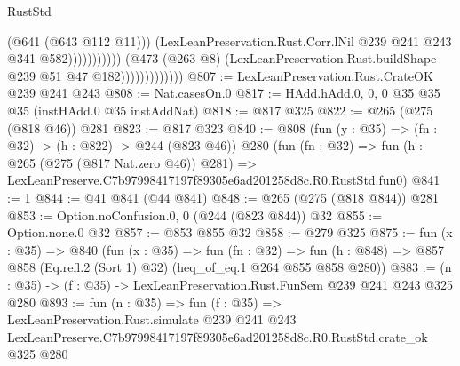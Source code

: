 \begin{lexlean}{RustStd}
\begin{coremodule}
                                                (@641 (@643 @112 @11)))
                                              (LexLeanPreservation.Rust.Corr.lNil
                                                @239
                                                @241
                                                @243
                                                @341
                                                @582)))))))))))
                          (@473
                            (@263 @8)
                            (LexLeanPreservation.Rust.buildShape @239 @51 @47 @182)))))))))))))
@807 := LexLeanPreservation.Rust.CrateOK @239 @241 @243
@808 := Nat.casesOn.{0}
@817 := HAdd.hAdd.{0, 0, 0} @35 @35 @35 (instHAdd.{0} @35 instAddNat)
@818 := @817 @325
@822 := @265 (@275 (@818 @46)) @281
@823 := @817 @323
@840 := @808
    (fun (y : @35) => (fn : @32) -> (h : @822) -> @244 (@823 @46))
    @280
    (fun (fn : @32) =>
    fun (h : @265 (@275 (@817 Nat.zero @46)) @281) =>
    LexLeanPreserve.C7b97998417197f89305e6ad201258d8c.R0.RustStd.fun0)
@841 := 1
@844 := @41 @841 (@44 @841)
@848 := @265 (@275 (@818 @844)) @281
@853 := Option.noConfusion.{0, 0} (@244 (@823 @844)) @32
@855 := Option.none.{0} @32
@857 := @853 @855 @32
@858 := @279 @325
@875 := fun (x : @35) =>
  @840
    (fun (x : @35) =>
    fun (fn : @32) =>
    fun (h : @848) => @857 @858 (Eq.refl.{2} (Sort 1) @32) (heq_of_eq.{1} @264 @855 @858 @280))
@883 := (n : @35) -> (f : @35) -> LexLeanPreservation.Rust.FunSem @239 @241 @243 @325 @280
@893 := fun (n : @35) =>
  fun (f : @35) =>
  LexLeanPreservation.Rust.simulate
    @239
    @241
    @243
    LexLeanPreserve.C7b97998417197f89305e6ad201258d8c.R0.RustStd.crate_ok
    @325
    @280
\end{coremodule}
\end{lexlean}
